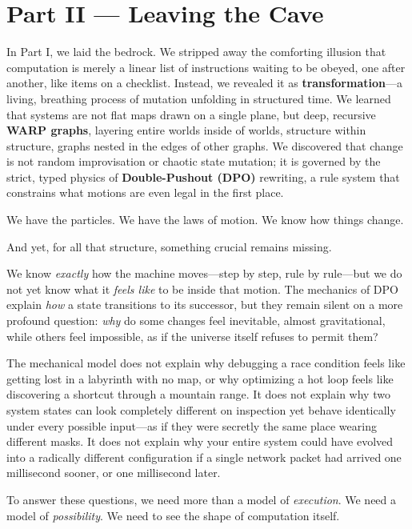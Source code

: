 \chapter*{Part II --- Leaving the Cave}

In Part I, we laid the bedrock. We stripped away the comforting illusion that computation is merely a linear list of instructions waiting to be obeyed, one after another, like items on a checklist. Instead, we revealed it as \textbf{transformation}---a living, breathing process of mutation unfolding in structured time. We learned that systems are not flat maps drawn on a single plane, but deep, recursive \textbf{WARP graphs}, layering entire worlds inside of worlds, structure within structure, graphs nested in the edges of other graphs. We discovered that change is not random improvisation or chaotic state mutation; it is governed by the strict, typed physics of \textbf{Double-Pushout (DPO)} rewriting, a rule system that constrains what motions are even legal in the first place.

We have the particles. We have the laws of motion. We know how things change.

And yet, for all that structure, something crucial remains missing.

We know \emph{exactly} how the machine moves---step by step, rule by rule---but we do not yet know what it \emph{feels like} to be inside that motion. The mechanics of DPO explain \emph{how} a state transitions to its successor, but they remain silent on a more profound question: \emph{why} do some changes feel inevitable, almost gravitational, while others feel impossible, as if the universe itself refuses to permit them?

The mechanical model does not explain why debugging a race condition feels like getting lost in a labyrinth with no map, or why optimizing a hot loop feels like discovering a shortcut through a mountain range. It does not explain why two system states can look completely different on inspection yet behave identically under every possible input---as if they were secretly the same place wearing different masks. It does not explain why your entire system could have evolved into a radically different configuration if a single network packet had arrived one millisecond sooner, or one millisecond later.

To answer these questions, we need more than a model of \emph{execution}. We need a model of \emph{possibility}. We need to see the shape of computation itself.

